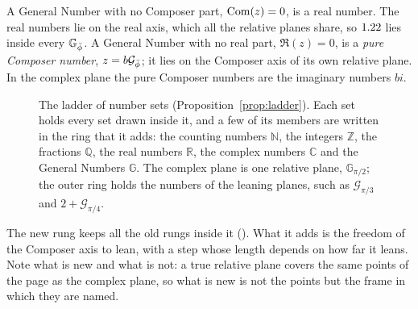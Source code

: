 \begin{remark}\label{rem:gn-kinds}
A General Number with no Composer part, $\operatorname{Com}(z) = 0$, is a real number. The real numbers lie on the real axis, which all the relative planes share, so $1.22$ lies inside every $\mathbb{G}_{\bar{\phi}}$. A General Number with no real part, $\Re(z) = 0$, is a \emph{pure Composer number}, $z = b\mathcal{G}_{\bar{\phi}}$; it lies on the Composer axis of its own relative plane. In the complex plane the pure Composer numbers are the imaginary numbers $bi$.
\end{remark}

\begin{figure}[tb]
\myfloatalign
{}
\caption[The ladder of number sets]{The ladder of number sets (Proposition~\ref{prop:ladder}). Each set holds every set drawn inside it, and a few of its members are written in the ring that it adds: the counting numbers $\mathbb{N}$, the integers $\mathbb{Z}$, the fractions $\mathbb{Q}$, the real numbers $\mathbb{R}$, the complex numbers $\mathbb{C}$ and the General Numbers $\mathbb{G}$. The complex plane is one relative plane, $\mathbb{G}_{\pi/2}$; the outer ring holds the numbers of the leaning planes, such as $\mathcal{G}_{\pi/3}$ and $2 + \mathcal{G}_{\pi/4}$.}
\label{fig:ladder}
\end{figure}

\begin{plainwords}
The new rung keeps all the old rungs inside it (). What it adds is the freedom of the Composer axis to lean, with a step whose length depends on how far it leans. Note what is new and what is not: a true relative plane covers the same points of the page as the complex plane, so what is new is not the points but the frame in which they are named.
\end{plainwords}

